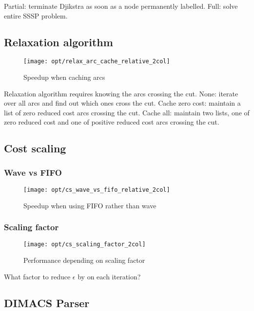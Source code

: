 Partial: terminate Djikstra as soon as a node permanently labelled. Full: solve entire SSSP problem.

\subsection{Relaxation algorithm}

\begin{figure}
    \centering
    \texttt{[image: opt/relax\_arc\_cache\_relative\_2col]}
    \caption{Speedup when caching arcs}
    \label{fig:opt-relax-cache-arcs}
\end{figure}

Relaxation algorithm requires knowing the arcs crossing the cut. None: iterate over all arcs and find out which ones cross the cut. Cache zero cost: maintain a list of zero reduced cost arcs crossing the cut. Cache all: maintain two lists, one of zero reduced cost and one of positive reduced cost arcs crossing the cut.

\subsection{Cost scaling}

\subsubsection{Wave vs FIFO}

\begin{figure}
    \centering
    \texttt{[image: opt/cs\_wave\_vs\_fifo\_relative\_2col]}
    \caption{Speedup when using FIFO rather than wave}
    \label{fig:opt-cs-wave-vs-fifo}
\end{figure}


\subsubsection{Scaling factor}

\begin{figure}
    \centering
    \texttt{[image: opt/cs\_scaling\_factor\_2col]}
    \caption{Performance depending on scaling factor}
    \label{fig:opt-cs-scaling-factor}
\end{figure}

What factor to reduce $\epsilon$ by on each iteration?

\subsection{DIMACS Parser}

